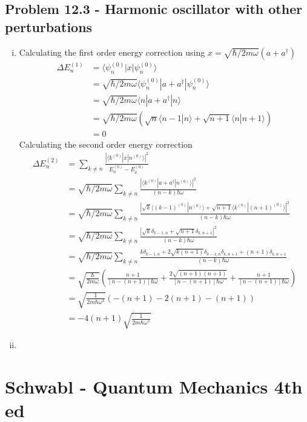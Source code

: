 \documentclass[10pt,a4paper]{book}
\theoremstyle{definition}
\begin{document}
\subsection{Problem 12.3 - Harmonic oscillator with other perturbations}
\begin{enumerate}[(i)]
\item Calculating the first order energy correction using $x=\sqrt{\hbar/2m\omega}(a+a^\dagger)$
\begin{align}
\Delta E^{(1)}_n
&=\langle\psi_n^{(0)}|x|\psi_n^{(0)}\rangle\\
&=\sqrt{\hbar/2m\omega}\langle\psi_n^{(0)}|a+a^\dagger|\psi_n^{(0)}\rangle\\
&=\sqrt{\hbar/2m\omega}\langle n|a+a^\dagger|n\rangle\\
&=\sqrt{\hbar/2m\omega}\left(\sqrt{n}\langle n-1|n\rangle+\sqrt{n+1}\langle n|n+1\rangle\right)\\
&=0
\end{align}
Calculating the second order energy correction
\begin{align}
\Delta E^{(2)}_n
&=\sum_{k\neq n}\frac{|\langle k^{(0)}|x|n^{(0)}\rangle|^2}{E^{(0)}_n-E^{(0)}_k} \\
&=\sqrt{\hbar/2m\omega}\sum_{k\neq n}\frac{|\langle k^{(0)}|a+a^\dagger|n^{(0)}\rangle|^2}{(n-k)\hbar\omega} \\
&=\sqrt{\hbar/2m\omega}\sum_{k\neq n}\frac{|\sqrt{k}\langle (k-1)^{(0)}|n^{(0)}\rangle+\sqrt{n+1}\langle k^{(0)}|(n+1)^{(0)}\rangle|^2}{(n-k)\hbar\omega} \\
&=\sqrt{\hbar/2m\omega}\sum_{k\neq n}\frac{|\sqrt{k}\delta_{k-1,n}+\sqrt{n+1}\delta_{k,n+1}|^2}{(n-k)\hbar\omega} \\
&=\sqrt{\hbar/2m\omega}\sum_{k\neq n}\frac{k\delta_{k-1,n}+2\sqrt{k(n+1)}\delta_{k-1,n}\delta_{k,n+1}+(n+1)\delta_{k,n+1}}{(n-k)\hbar\omega} \\
&=\sqrt{\frac{\hbar}{2m\omega}}\left(
\frac{n+1}{[n-(n+1)]\hbar\omega}
+\frac{2\sqrt{(n+1)(n+1)}}{[n-(n+1)]\hbar\omega}
+\frac{n+1}{[n-(n+1)]\hbar\omega}
\right)\\
&=\sqrt{\frac{1}{2m\hbar\omega^3}}\left(
-(n+1)
-2(n+1)
-(n+1)
\right)\\
&=-4(n+1)\sqrt{\frac{1}{2m\hbar\omega^3}}
\end{align}
\item
\end{enumerate}


\section{{\sc Schwabl} - Quantum Mechanics 4th ed}
\end{document}
